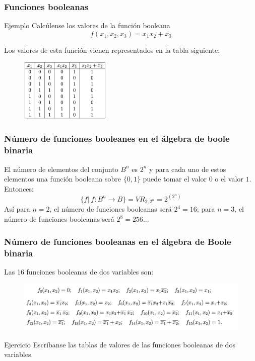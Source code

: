 \documentclass{beamer}
\begin{document}
\begin{frame}
\frametitle{Funciones booleanas}
\begin{block}{Ejemplo}
Calc\'ulense los valores de la funci\'on booleana
\[f(x_1,x_2,x_3) = x_1x_2+\bar{x_3}\]
\end{block}
Los valores de esta funci\'on vienen representados en la tabla siguiente:

\begin{figure}[h]
\label{fig:volum}
\centering
\includegraphics[height=3cm]{ex1}
\end{figure}
\end{frame}



\begin{frame}
\frametitle{N\'umero de funciones booleanes en el \'algebra de boole binaria}
El n\'umero de elementos del conjunto $B^n$ es $2^n$ y para cada uno de estos elementos una funci\'on booleana sobre $\{0,1\}$ puede tomar el valor $0$ o el valor $1$. Entonces:
\[\{f|\ f:B^n\longrightarrow B\} = VR_{2,2^n} = 2^{(2^n)}\]
As\'i para $n=2$, el n\'umero de funciones booleanas ser\'a $2^4 = 16$; para $n=3$, el n\'umero de funciones booleanas ser\'a $2^8 = 256$...
\end{frame}



\begin{frame}
\frametitle{N\'umero de funciones booleanas en el \'algebra de Boole binaria}
Las 16 funciones booleanas de dos variables son:
\begin{figure}[h]
\label{fig:volumen}
\centering
\includegraphics[width=\textwidth]{ex2}
\end{figure}
\begin{block}{Ejercicio}
Escr\'ibanse las tablas de valores de las funciones booleanas de dos variables.
\end{block}
\end{frame}
\end{document}
